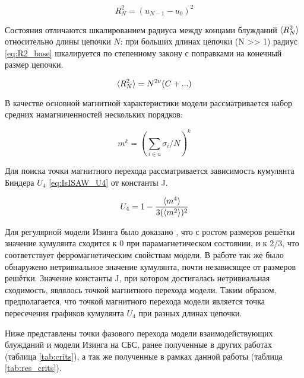 \begin{equation}
\label{eq:R2_base}
	R^2_N = (u_{N-1} - u_{0})^2
\end{equation}

Состояния отличаются шкалированием радиуса между концами блужданий $\langle R^2_N \rangle$ относительно длины цепочки $N$:
при больших длинах цепочки (N >> 1) радиус \eqref{eq:R2_base} шкалируется по степенному закону с поправками на конечный размер цепочки.

\begin{equation}
	\langle R^2_N \rangle = N^{2\nu}(C + ...)
\end{equation}

В качестве основной магнитной характеристики модели рассматривается набор средних намагниченностей нескольких порядков:

\begin{equation}
\label{eq:IsISAW_m2}
	m^{k} = (\sum_{i \in u} \sigma_i / N)^k
\end{equation} 

Для поиска точки магнитного перехода рассматривается зависимость кумулянта Биндера $U_4$ \eqref{eq:IsISAW_U4} от константы J.

\begin{equation}
\label{eq:IsISAW_U4}
	U_4 = 1 - \frac{\langle m^4 \rangle}{3 (\langle m^2 \rangle)^2}
\end{equation}

Для регулярной модели Изинга было доказано \cite{Binder1981_Ising}, 
что с ростом размеров решётки значение кумулянта сходится к 0 при парамагнетическом состоянии, 
и к 2/3, что соответствует ферромагнетическим свойствам модели.
В работе \cite{Binder1981_Ising} так же было обнаружено нетривиальное значение кумулянта, почти независящее от размеров решётки.
Значение константы J, при котором достигалась нетривиальная сходимость, являлось точкой магнитного перехода модели.
Таким образом, предполагается, что точкой магнитного перехода модели является 
точка пересечения графиков кумулянта $U_4$ при разных длинах цепочки.

Ниже представлены точки фазового перехода модели взаимодействующих блужданий и модели Изинга на СБС, ранее полученные в других работах (таблица \ref{tab:crits}), 
а так же полученные в рамках данной работы (таблица \ref{tab:res_crits}).

